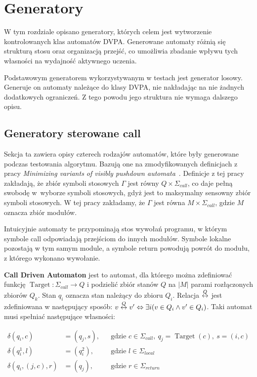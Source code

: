 \chapter{Generatory}
\label{chap:generators}

W tym rozdziale opisano generatory, których celem jest wytworzenie kontrolowanych klas automatów DVPA.
Generowane automaty różnią się strukturą stosu oraz organizacją przejść, co umożliwia zbadanie wpływu tych własności
na wydajność aktywnego uczenia.

Podstawowym generatorem wykorzystywanym w testach jest generator losowy. Generuje on automaty należące do klasy DVPA,
nie nakładając na nie żadnych dodatkowych ograniczeń. Z tego powodu jego struktura nie wymaga dalszego opisu.

\section{Generatory sterowane call}
\label{chap:CDA}

Sekcja ta zawiera opisy czterech rodzajów automatów, które były generowane podczas testowania algorytmu. Bazują one na zmodyfikowanych definicjach
z pracy \textit{Minimizing variants of visibly pushdown automata}~\cite{variants}. Definicje z tej pracy zakładają, że zbiór symboli
stosowych $\Gamma$ jest równy $Q\times\Sigma_{call}$, co daje pełną swobodę w~wyborze symboli stosowych, gdyż jest to maksymalny sensowny
zbiór symboli stosowych. W tej pracy zakładamy, że $\Gamma$ jest równa $M\times\Sigma_{call}$, gdzie $M$ oznacza zbiór modułów.

Intuicyjnie automaty te przypominają stos wywołań programu, w którym symbole call odpowiadają przejściom do innych modułów.
Symbole lokalne pozostają w tym samym module, a symbole return powodują powrót do modułu, z którego wykonano wywołanie.

\textbf{Call Driven Automaton} jest to automat, dla którego można zdefiniować funkcję $\operatorname{Target}: \Sigma_{call} \rightarrow Q$ i podzielić zbiór
stanów $Q$ na $|M|$ parami rozłączonych zbiorów $Q_k$. Stan $q_i$ oznacza stan należący do zbioru $Q_i$. Relacja $\mathrel{\overset{Q}{\leftrightarrow}}$ jest zdefiniowana
w następujący sposób: $v \mathrel{\overset{Q}{\leftrightarrow}} v' \Leftrightarrow \exists i (v \in Q_i \land v' \in Q_i)$. Taki automat musi spełniać następujące własności:


\begin{equation}
\begin{aligned}
    \delta(q_i, c) &= (q_j, s),
    && \text{gdzie } c \in \Sigma_{call},\ q_j = \operatorname{Target}(c),\ s = (i, c) \\
    \delta(q_i^{1}, l) &= (q_i^{2}),
    && \text{gdzie } l \in \Sigma_{local} \\
    \delta(q_i, (j, c), r) &= (q_j),
    && \text{gdzie } r \in \Sigma_{return}
\end{aligned}
\end{equation}


